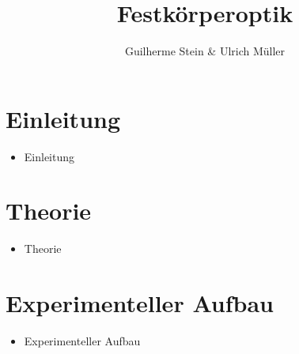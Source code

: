 \documentclass[paper=a4,fontsize=10pt,DIV=18,twocolumn,parskip=half]{scrartcl}
\numberwithin{equation}{section}    %
\begin{document}
\title{Festkörperoptik}                  
\author{Guilherme Stein \& Ulrich Müller}         
\date{}                             %



\section{Einleitung}
\begin{itemize}
\item Einleitung
\end{itemize}


\section{Theorie}
\begin{itemize}
\item Theorie
\end{itemize}


\section{Experimenteller Aufbau}
\begin{itemize}
\item Experimenteller Aufbau
\end{itemize}
\end{document}
